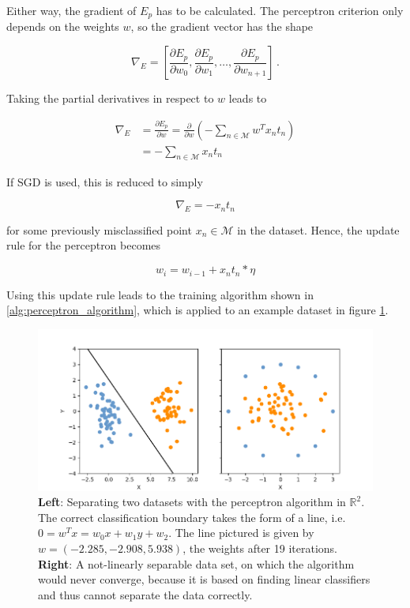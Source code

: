 Either way, the gradient of $E_p$ has to be calculated. The perceptron criterion only depends on the weights $w$, so the gradient vector has the shape

\[ \nabla_E = \left[ \frac{\partial E_p}{\partial w_0}, \frac{\partial E_p}{\partial w_1}, \dots, \frac{\partial E_p}{\partial w_{n+1}} \right ] \,. \]

\noindent Taking the partial derivatives in respect to $w$ leads to

\begin{align}
 	\nabla_E &= \frac{\partial E_p}{\partial w} = \frac{\partial}{\partial w} \left (- \sum \limits_{n \in \mathcal{M}} w^T x_n t_n \right ) \\
 	&= -\sum \limits_{n \in \mathcal{M}} x_n t_n
\end{align}

\noindent If SGD is used, this is reduced to simply

\[ \nabla_E = -x_n t_n\]

\noindent for some previously misclassified point $x_n \in \mathcal{M}$ in the dataset. Hence, the update rule for the perceptron becomes

\[w_i = w_{i - 1} + x_n t_n * \eta\]

\noindent Using this update rule leads to the training algorithm shown in \ref{alg:perceptron_algorithm}, which is applied to an example dataset in figure \ref{fig:perceptron}.

\begin {figure}[!ht]
	\begin{center}
		\includegraphics[scale=0.6]{img/fig_perceptron}
	\end{center}
	\caption{\textbf{Left}: Separating two datasets with the perceptron algorithm in $\mathbb{R}^2$. The correct classification boundary takes the form of a line, i.e. $0 = w^{T}x = w_0 x + w_1 y + w_2$. The line pictured is given by $w = (-2.285, -2.908, 5.938)$, the weights after 19 iterations. \textbf{Right}: A not-linearly separable data set, on which the algorithm would never converge, because it is based on finding linear classifiers and thus cannot separate the data correctly.}
	\label{fig:perceptron}
\end {figure}

